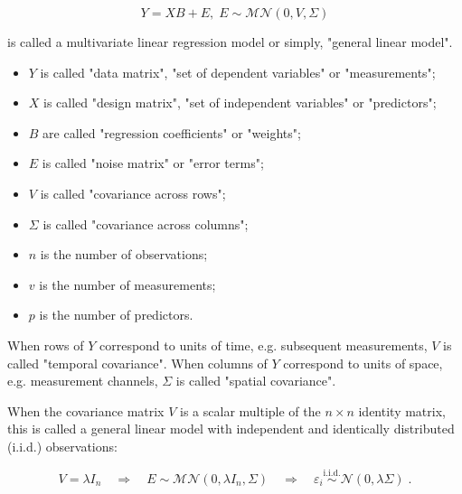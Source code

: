 \documentclass[a4paper,12pt,twoside]{book}
\begin{document}
\begin{equation} \label{eq:glm-glm}
Y = X B + E, \; E \sim \mathcal{MN}(0, V, \Sigma)
\end{equation}

is called a multivariate linear regression model or simply, "general linear model".

\begin{itemize}

\item $Y$ is called "data matrix", "set of dependent variables" or "measurements";

\item $X$ is called "design matrix", "set of independent variables" or "predictors";

\item $B$ are called "regression coefficients" or "weights";

\item $E$ is called "noise matrix" or "error terms";

\item $V$ is called "covariance across rows";

\item $\Sigma$ is called "covariance across columns";

\item $n$ is the number of observations;

\item $v$ is the number of measurements;

\item $p$ is the number of predictors.

\end{itemize}

When rows of $Y$ correspond to units of time, e.g. subsequent measurements, $V$ is called "temporal covariance". When columns of $Y$ correspond to units of space, e.g. measurement channels, $\Sigma$ is called "spatial covariance".

When the covariance matrix $V$ is a scalar multiple of the $n \times n$ identity matrix, this is called a general linear model with independent and identically distributed (i.i.d.) observations:

\begin{equation} \label{eq:glm-glm-iid}
V = \lambda I_n \quad \Rightarrow \quad E \sim \mathcal{MN}(0, \lambda I_n, \Sigma) \quad \Rightarrow \quad \varepsilon_i \overset{\text{i.i.d.}}{\sim} \mathcal{N}(0, \lambda \Sigma) \; .
\end{equation}
\end{document}
